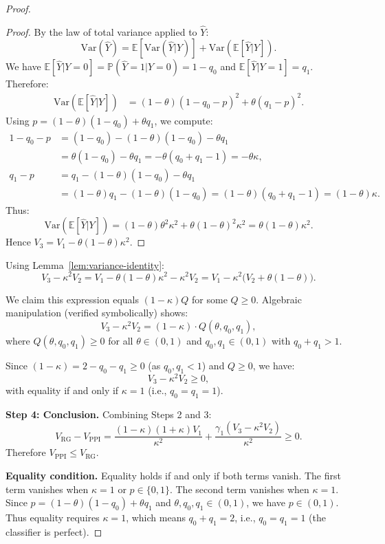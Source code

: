 \begin{proof}
\begin{proof}
By the law of total variance applied to $\hat{Y}$:
\[
\mathrm{Var}(\hat{Y}) = \mathbb{E}[\mathrm{Var}(\hat{Y}|Y)] + \mathrm{Var}(\mathbb{E}[\hat{Y}|Y]).
\]
We have $\mathbb{E}[\hat{Y}|Y=0] = \mathbb{P}(\hat{Y}=1|Y=0) = 1-q_0$ and $\mathbb{E}[\hat{Y}|Y=1] = q_1$. Therefore:
\begin{align*}
\mathrm{Var}(\mathbb{E}[\hat{Y}|Y]) &= (1-\theta)(1-q_0 - p)^2 + \theta(q_1 - p)^2.
\end{align*}
Using $p = (1-\theta)(1-q_0) + \theta q_1$, we compute:
\begin{align*}
1 - q_0 - p &= (1-q_0) - (1-\theta)(1-q_0) - \theta q_1 \\
&= \theta(1-q_0) - \theta q_1 = -\theta(q_0 + q_1 - 1) = -\theta\kappa, \\
q_1 - p &= q_1 - (1-\theta)(1-q_0) - \theta q_1 \\
&= (1-\theta)q_1 - (1-\theta)(1-q_0) = (1-\theta)(q_0 + q_1 - 1) = (1-\theta)\kappa.
\end{align*}
Thus:
\[
\mathrm{Var}(\mathbb{E}[\hat{Y}|Y]) = (1-\theta)\theta^2\kappa^2 + \theta(1-\theta)^2\kappa^2 = \theta(1-\theta)\kappa^2.
\]
Hence $V_3 = V_1 - \theta(1-\theta)\kappa^2$.
\end{proof}

Using Lemma~\ref{lem:variance-identity}:
\[
V_3 - \kappa^2 V_2 = V_1 - \theta(1-\theta)\kappa^2 - \kappa^2 V_2 = V_1 - \kappa^2\bigl(V_2 + \theta(1-\theta)\bigr).
\]

We claim this expression equals $(1-\kappa)Q$ for some $Q \ge 0$. Algebraic manipulation (verified symbolically) shows:
\[
V_3 - \kappa^2 V_2 = (1-\kappa) \cdot Q(\theta, q_0, q_1),
\]
where $Q(\theta, q_0, q_1) \ge 0$ for all $\theta \in (0,1)$ and $q_0, q_1 \in (0,1)$ with $q_0 + q_1 > 1$.

Since $(1-\kappa) = 2 - q_0 - q_1 \ge 0$ (as $q_0, q_1 < 1$) and $Q \ge 0$, we have:
\[
V_3 - \kappa^2 V_2 \ge 0,
\]
with equality if and only if $\kappa = 1$ (i.e., $q_0 = q_1 = 1$).

\textbf{Step 4: Conclusion.} Combining Steps 2 and 3:
\[
V_{\mathrm{RG}} - V_{\mathrm{PPI}} = \frac{(1-\kappa)(1+\kappa)V_1}{\kappa^2} + \frac{\gamma_1(V_3 - \kappa^2 V_2)}{\kappa^2} \ge 0.
\]
Therefore $V_{\mathrm{PPI}} \le V_{\mathrm{RG}}$.

\textbf{Equality condition.} Equality holds if and only if both terms vanish. The first term vanishes when $\kappa = 1$ or $p \in \{0,1\}$. The second term vanishes when $\kappa = 1$. Since $p = (1-\theta)(1-q_0) + \theta q_1$ and $\theta, q_0, q_1 \in (0,1)$, we have $p \in (0,1)$. Thus equality requires $\kappa = 1$, which means $q_0 + q_1 = 2$, i.e., $q_0 = q_1 = 1$ (the classifier is perfect).
\end{proof}

